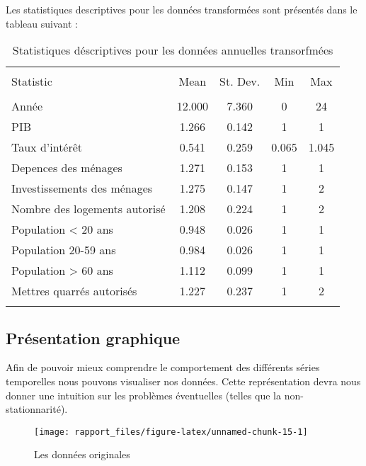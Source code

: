 \documentclass[11pt,]{article}
\begin{document}
Les statistiques descriptives pour les données transformées sont
présentés dans le tableau suivant :

\FloatBarrier

\begin{table}[!htbp] \centering 
\begin{tabular}{@{\extracolsep{5pt}}lcccc} 
\\[-1.8ex]\hline 
\hline \\[-1.8ex] 
Statistic & \multicolumn{1}{c}{Mean} & \multicolumn{1}{c}{St. Dev.} & \multicolumn{1}{c}{Min} & \multicolumn{1}{c}{Max} \\ 
\hline \\[-1.8ex] 
Année & 12.000 & 7.360 & 0 & 24 \\ 
PIB & 1.266 & 0.142 & 1 & 1 \\ 
Taux d'intérêt & 0.541 & 0.259 & 0.065 & 1.045 \\ 
Depences des ménages & 1.271 & 0.153 & 1 & 1 \\ 
Investissements des ménages & 1.275 & 0.147 & 1 & 2 \\ 
Nombre des logements autorisé & 1.208 & 0.224 & 1 & 2 \\ 
Population < 20 ans & 0.948 & 0.026 & 1 & 1 \\ 
Population 20-59 ans & 0.984 & 0.026 & 1 & 1 \\ 
Population > 60 ans & 1.112 & 0.099 & 1 & 1 \\ 
Mettres quarrés autorisés & 1.227 & 0.237 & 1 & 2 \\ 
\hline \\[-1.8ex] 
\end{tabular} 
  \caption{Statistiques déscriptives pour les données annuelles transorfmées} 
  \label{} 
\end{table}

\FloatBarrier

\hypertarget{presentation-graphique}{%
\subsection{Présentation graphique}\label{presentation-graphique}}

Afin de pouvoir mieux comprendre le comportement des différents séries
temporelles nous pouvons visualiser nos données. Cette représentation
devra nous donner une intuition sur les problèmes éventuelles (telles
que la non-stationnarité).

\FloatBarrier

\begin{figure}[!htbp]

{\centering \texttt{[image: rapport\_files/figure-latex/unnamed-chunk-15-1]} 

}

\caption{Les données originales}\label{fig:unnamed-chunk-15}
\end{figure}
\end{document}
